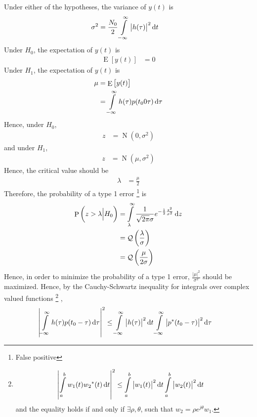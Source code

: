 \documentclass[titlepage, fleqn, a4paper, 12pt, twoside]{article}
\theoremstyle{definition}
\theoremstyle{theorem}
\DeclareMathOperator{\prob}{\mathrm{P}}
\DeclareMathOperator{\expct}{\mathrm{E}}
\DeclareMathOperator{\normal}{\mathrm{N}}
\DeclareMathOperator{\Q}{\mathcal{Q}}
\begin{document}
Under either of the hypotheses, the variance of $y(t)$ is
\begin{align*}
	\sigma^2 &= \frac{N_0}{2} \int\limits_{-\infty}^{\infty} \left| h(\tau) \right|^2 \dif t
\end{align*}
Under $H_0$, the expectation of $y(t)$ is
\begin{align*}
	\expct\left[ y(t) \right] &= 0
\end{align*}
Under $H_1$, the expectation of $y(t)$ is
\begin{align*}
	\mu &= \expct\left[ y(t) \right]\\
	&= \int\limits_{-\infty}^{\infty} h(\tau) p(t_0 0 \tau) \dif \tau
\end{align*}
Hence, under $H_0$,
\begin{align*}
	z &= \normal\left( 0,\sigma^2 \right)
\end{align*}
and under $H_1$,
\begin{align*}
	z &= \normal\left( \mu,\sigma^2 \right)
\end{align*}
Hence, the critical value should be
\begin{align*}
	\lambda &= \frac{\mu}{2}
\end{align*}
Therefore, the probability of a type 1 error
\footnote{False positive}
is
\begin{align*}
	\prob\left( z > \lambda \Big| H_0 \right) &= \int\limits_{\lambda}^{\infty} \frac{1}{\sqrt{2 \pi} \sigma} e^{-\frac{1}{2} \frac{z^2}{\sigma^2}} \dif z\\
	&= \Q\left( \frac{\lambda}{\sigma} \right)\\
	&= \Q\left( \frac{\mu}{2 \sigma} \right)
\end{align*}
Hence, in order to minimize the probability of a type 1 error, $\frac{|\mu|^2}{\sigma^2}$ should be maximized.
Hence, by the Cauchy-Schwartz inequality for integrals over complex valued functions
\footnote{
	\begin{align*}
		\left| \int\limits_{a}^{b} w_1(t) {w_2}^*(t) \dif t \right|^2 &\le \int\limits_{a}^{b} \left| w_1(t) \right|^2 \dif t \int\limits_{a}^{b} \left| w_2(t) \right|^2 \dif t
	\end{align*}
	and the equality holds if and only if $\exists \rho, \theta$, such that $w_2 = \rho e^{j \theta} w_1$.
}
,
\begin{align*}
	\left| \int\limits_{-\infty}^{\infty} h(\tau) p(t_0 - \tau) \dif \tau \right|^2 &\le \int\limits_{-\infty}^{\infty} \left| h(\tau) \right|^2 \dif t \int\limits_{-\infty}^{\infty} \left| p^*(t_0 - \tau) \right|^2 \dif \tau
\end{align*}
\end{document}
